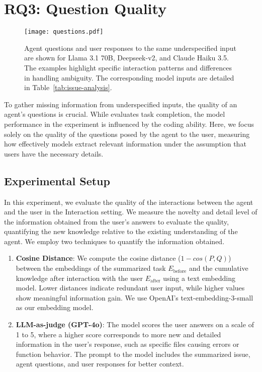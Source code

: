 \section{RQ3: Question Quality}
\begin{figure*}[!t]
    \centering
    \texttt{[image: questions.pdf]}
    \vspace{-20pt}
    \caption{Agent questions and user responses to the same underspecified input are shown for Llama 3.1 70B, Deepseek-v2, and Claude Haiku 3.5. The examples highlight specific interaction patterns and differences in handling ambiguity. The corresponding model inputs are detailed in Table~\ref{tab:issue-analysis}.}
    \vspace{-12pt}
    \label{fig:questions}
\end{figure*}
\label{sec:QuestionQuality}
To gather missing information from underspecified inputs, the quality of an agent’s questions is crucial. While  evaluates task completion, the model performance in the experiment is influenced by the coding ability. Here, we focus solely on the quality of the questions posed by the agent to the user, measuring how effectively models extract relevant information under the assumption that users have the necessary details.

\subsection{Experimental Setup}
In this experiment, we evaluate the quality of the interactions between the agent and the user in the Interaction setting. We measure the novelty and detail level of the information obtained from the user's answers to evaluate the quality, quantifying the new knowledge relative to the existing understanding of the agent. We employ two techniques to quantify the information obtained. 
\begin{enumerate}[itemsep=0pt, topsep=0pt]
\item \textbf{Cosine Distance}: 
We compute the cosine distance ($1-cos(P,Q)$) between the embeddings of the summarized task \( E_{\text{before}} \) and the cumulative knowledge after interaction with the user \( E_{\text{after}} \) using a text embedding model. Lower distances indicate redundant user input, while higher values show meaningful information gain. We use OpenAI's text-embedding-3-small as our embedding model. 

\item \textbf{LLM-as-judge (GPT-4o)}: The model scores the user answers on a scale of 1 to 5, where a higher score corresponds to more new and detailed information in the user's response, such as specific files causing errors or function behavior. The prompt to the model includes the summarized issue, agent questions, and user responses for better context.
\end{enumerate}


